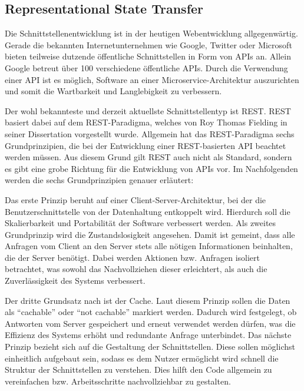 \subsection{Representational State Transfer}

Die Schnittstellenentwicklung ist in der heutigen Webentwicklung allgegenwärtig.
Gerade die bekannten Internetunternehmen wie Google\autocite{MS-GoogleLLC.2020}, Twitter\autocite{MS-TwitterInc..01.03.2020} oder Microsoft\autocite{MS-MicrosoftCorporation.21.05.2018} bieten teilweise dutzende öffentliche Schnittstellen in Form von \acp{API} an.
Allein Google betreut über 100 verschiedene öffentliche \acp{API}\autocite{rf-google-api-alle}.
Durch die Verwendung einer \ac{API} ist es möglich, Software an einer Microservice-Architektur auszurichten und somit die Wartbarkeit und Langlebigkeit zu verbessern.\autocite{rf-fowler2015microservices}

Der wohl bekannteste und derzeit aktuellste Schnittstellentyp ist \ac{REST}. 
\ac{REST} basiert dabei auf dem \ac{REST}-Paradigma, welches von Roy Thomas Fielding in seiner Dissertation\autocite{MS-Fielding.} vorgestellt wurde. Allgemein hat das \ac{REST}-Paradigma sechs Grundprinzipien, die bei der Entwicklung einer \ac{REST}-basierten \ac{API} beachtet werden müssen. 
Aus diesem Grund gilt \ac{REST} auch nicht als Standard, sondern es gibt eine grobe Richtung für die Entwicklung von \acp{API} vor.
Im Nachfolgenden werden die sechs Grundprinzipien genauer erläutert:

Das erste Prinzip beruht auf einer Client-Server-Architektur, bei der die Benutzerschnittstelle von der Datenhaltung entkoppelt wird.
Hierdurch soll die Skalierbarkeit und Portabilität der Software verbessert werden.
Als zweites Grundprinzip wird die Zustandslosigkeit angesehen.
Damit ist gemeint, dass alle Anfragen vom Client an den Server stets alle nötigen Informationen beinhalten, die der Server benötigt.
Dabei werden Aktionen bzw. Anfragen isoliert betrachtet, was sowohl das Nachvollziehen dieser erleichtert, als auch die Zuverlässigkeit des Systems verbessert.

Der dritte Grundsatz nach \citeauthor{MS-Fielding.} ist der Cache. 
Laut diesem Prinzip sollen die Daten als \enquote{cachable} oder \enquote{not cachable} markiert werden.
Dadurch wird festgelegt, ob Antworten vom Server gespeichert und erneut verwendet werden dürfen, was die Effizienz des Systems erhöht und redundante Anfrage unterbindet.
Das nächste Prinzip bezieht sich auf die Gestaltung der Schnittstellen. 
Diese sollen möglichst einheitlich aufgebaut sein, sodass es dem Nutzer ermöglicht wird schnell die Struktur der Schnittstellen zu verstehen. 
Dies hilft den Code allgemein zu vereinfachen bzw. Arbeitsschritte nachvollziehbar zu gestalten.

